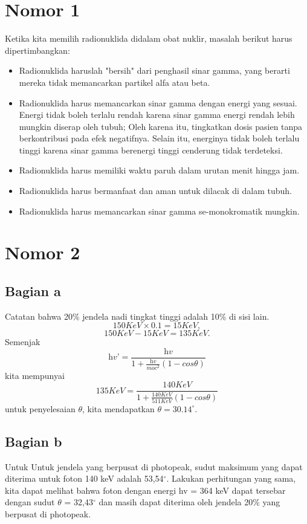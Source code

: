 \section{Nomor 1}
Ketika kita memilih radionuklida didalam obat nuklir, masalah berikut harus dipertimbangkan:
\begin{itemize}
  \item Radionuklida haruslah "bersih" dari penghasil sinar gamma, yang berarti mereka tidak memancarkan partikel alfa atau beta.
  \item Radionuklida harus memancarkan sinar gamma dengan energi yang sesuai. Energi tidak boleh terlalu rendah karena sinar gamma energi rendah lebih mungkin diserap oleh tubuh; Oleh karena itu, tingkatkan dosis pasien tanpa berkontribusi pada efek negatifnya. Selain itu, energinya tidak boleh terlalu tinggi karena sinar gamma berenergi tinggi cenderung tidak terdeteksi.
  \item Radionuklida harus memiliki waktu paruh dalam urutan menit hingga jam.
  \item Radionuklida harus bermanfaat dan aman untuk dilacak di dalam tubuh.
  \item Radionuklida harus memancarkan sinar gamma se-monokromatik mungkin.
\end{itemize}

\section{Nomor 2}
\subsection{Bagian a}
Catatan bahwa 20\% jendela nadi tingkat tinggi adalah 10\% di sisi lain.
\begin{displaymath}
150 KeV \times 0.1 = 15 KeV ,
\end{displaymath}
\begin{displaymath}
150 KeV - 15 KeV = 135 KeV.
\end{displaymath}
Semenjak
\begin{displaymath}
\textit{hv'} = \frac {\textit{hv}}{1 + \frac {\textit{hv}}{mo\textit{c}^2}(1 - cos \theta)}
\end{displaymath}
kita mempunyai
\begin{displaymath}
135 KeV = \frac {140 KeV}{1 + \frac {140 KeV}{511 KeV}(1 - cos \theta)}
\end{displaymath}
untuk penyelesaian $\theta$, kita mendapatkan $\theta = 30.14 ^\circ$.
\subsection{Bagian b}
Untuk Untuk jendela yang berpusat di photopeak, sudut maksimum yang dapat diterima untuk foton 140 keV adalah 53,54$^\circ$. Lakukan perhitungan yang sama, kita dapat melihat bahwa foton dengan energi hv = 364 keV dapat tersebar dengan sudut $\theta$ = 32,43$^\circ$ dan masih dapat diterima oleh jendela 20\% yang berpusat di photopeak.

